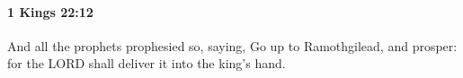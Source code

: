 
		\paragraph{1 Kings 22:12} %
			\label{1KINGS-22-12}

			And all the prophets prophesied so, saying, Go up to Ramothgilead, and prosper: for the LORD shall deliver it into the king’s hand.


